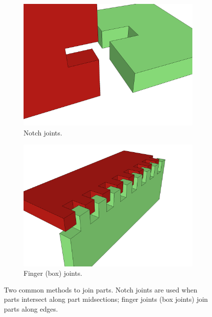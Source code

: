 \begin{figure}[t]
  \centering
  \begin{subfigure}[b]{0.4\textwidth}
    \centering
    \includegraphics[width=\textwidth]{img/joint-notch.png}
    \caption{Notch joints.}
    \label{fig:joint-notch}
  \end{subfigure}
  \hspace{8mm}
  \begin{subfigure}[b]{0.4\textwidth}
    \centering
    \includegraphics[width=\textwidth]{img/joint-finger.png}
    \caption{Finger (box) joints.}
    \label{fig:joint-finger}
  \end{subfigure}
  \caption[Two Common Notch Types]{Two common methods to join
      parts. Notch joints are used when parts intersect along part
      midsections; finger joints (box joints) join parts along edges.}
  \label{fig:joint}
\end{figure}
